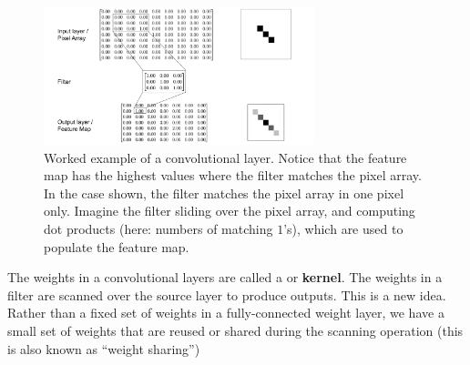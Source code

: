 \begin{figure}[h]
\centering
\includegraphics[width=0.7\textwidth]{images/CNN_WorkedExample.png}
\caption[Jeff Yoshimi]{Worked example of a convolutional layer. Notice that the feature map has the highest values where the filter matches the pixel array. In the case shown, the filter matches the pixel array in one pixel only. Imagine the filter sliding over the pixel array, and computing dot products (here: numbers of matching $1$'s), which are used to populate the feature map.}
\label{cnn_workedExample}
\end{figure}

The weights in a convolutional layers are called a  or \textbf{kernel}. The weights in a filter are scanned over the source layer to produce outputs. This is a new idea. Rather than a fixed set of weights in a fully-connected weight layer, we have a small set of weights that are reused or shared during the scanning operation (this is also known as ``weight sharing'')

